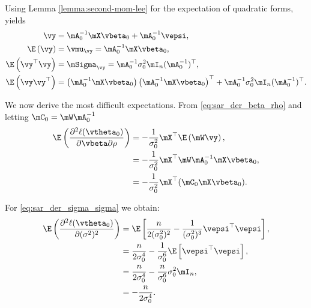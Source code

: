\documentclass[english,12pt]{book}\usepackage[]{graphicx}\usepackage[]{xcolor}
\begin{document}
\begin{subappendices}
Using Lemma \ref{lemma:second-mom-lee} for the expectation of quadratic forms, yields
\begin{equation}
\begin{aligned}
	\vy & =  \mA_0^{-1}\mX\vbeta_0 + \mA_0^{-1}\vepsi, \\
	\E\left(\vy\right)   & = \vmu_{\vy} = \mA_0^{-1}\mX\vbeta_0, \\
	\E\left(\vy^\top\vy\right) & = \mSigma_{\vy} = \mA_0^{-1}\sigma^2_0\mI_n(\mA_0^{-1})^\top, \\
	\E\left(\vy\vy^\top\right) & = \left(\mA_0^{-1}\mX\vbeta_0\right) \left(\mA_0^{-1}\mX\vbeta_0\right)^\top + \mA_0^{-1}\sigma^2_0\mI_n(\mA_0^{-1})^\top.
\end{aligned}
\end{equation}

We now derive the most difficult expectations. From \eqref{eq:sar_der_beta_rho} and letting $\mC_0 = \mW\mA^{-1}_0$
\begin{equation}\label{eq:E_der_beta_rho}
\begin{aligned}
\E\left(\frac{\partial^2  \ell(\vtheta_0)}{\partial \vbeta \partial \rho}\right) & = - \frac{1}{\sigma^2_0} \mX^\top\E\left(\mW\vy\right), \\
& = - \frac{1}{\sigma^2_0} \mX^\top\mW\mA^{-1}_0\mX\vbeta_0, \\
& = - \frac{1}{\sigma^2_0} \mX^\top(\mC_0\mX\vbeta_0).
\end{aligned}	
\end{equation}

For \eqref{eq:sar_der_sigma_sigma} we obtain:
\begin{equation}\label{eq:E_der_sigma_sigma}
  \begin{aligned}
\E\left(\frac{\partial^2 \ell(\vtheta_0)}{\partial (\sigma^2)^2}\right) & = \E\left[\frac{n}{2(\sigma^2_0) ^2} - \frac{1}{(\sigma^2_0)^3} \vepsi^\top \vepsi\right], \\
& = \frac{n}{2\sigma^4_0} - \frac{1}{\sigma^6_0}\E\left[\vepsi^\top \vepsi\right], \\
& = \frac{n}{2\sigma^4_0} - \frac{n}{\sigma^6_0} \sigma^2_0 \mI_n, \\
& = - \frac{n}{2\sigma^4_0}. 
  \end{aligned}
\end{equation}


\end{subappendices}
\end{document}
